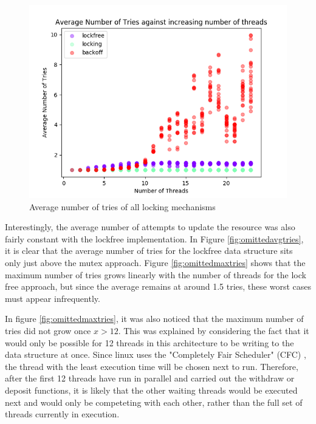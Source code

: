 \documentclass[12pt]{article}
\begin{document}
\begin{figure}[!h]
  \centering
  \includegraphics[width=0.8\linewidth]{images/mergedavgtries}
	\caption{Average number of tries of all locking mechanisms}
  \label{fig:mergeavgtries}
  
\end{figure}
Interestingly, the average number of attempts to update the resource was also fairly constant with the lockfree implementation. In Figure \ref{fig:omittedavgtries}, it is clear that the average number of tries for the lockfree data structure sits only just above the mutex approach. Figure \ref{fig:omittedmaxtries} shows that the maximum number of tries grows linearly with the number of threads for the lock free approach, but since the average remains at around 1.5 tries, these worst cases must appear infrequently. 

In figure \ref{fig:omittedmaxtries}, it was also noticed that the maximum number of tries did not grow once $x > 12$. This was explained by considering the fact that it would only be possible for 12 threads in this architecture to be writing to the data structure at once. Since linux uses the "Completely Fair Scheduler" (CFC) \cite{cfc}, the thread with the least execution time will be chosen next to run. Therefore, after the first 12 threads have run in parallel and carried out the withdraw or deposit functions, it is likely that the other waiting threads would be executed next and would only be competeting with each other, rather than the full set of threads currently in execution.
\end{document}
